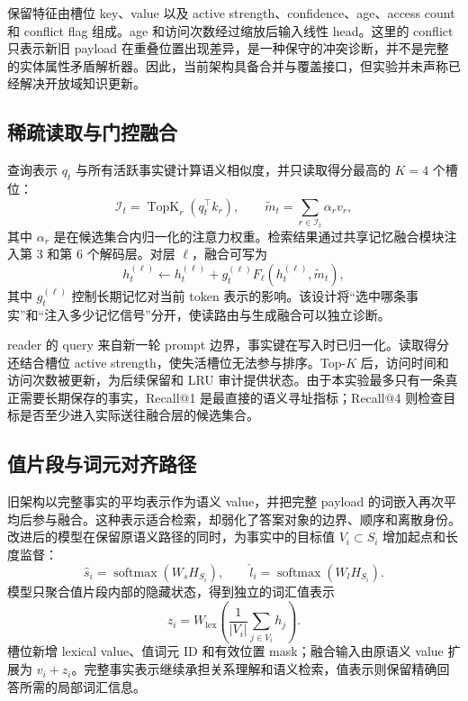 \documentclass[letterpaper]{article}
\begin{document}
保留特征由槽位 key、value 以及 active strength、confidence、age、access count 和 conflict flag 组成。age 和访问次数经过缩放后输入线性 head。这里的 conflict 只表示新旧 payload 在重叠位置出现差异，是一种保守的冲突诊断，并不是完整的实体属性矛盾解析器。因此，当前架构具备合并与覆盖接口，但实验并未声称已经解决开放域知识更新。

\subsection{稀疏读取与门控融合}

查询表示 $q_t$ 与所有活跃事实键计算语义相似度，并只读取得分最高的 $K=4$ 个槽位：
\begin{equation}
\mathcal{I}_t=\operatorname{TopK}_{r}
\left(q_t^\top k_r\right),\qquad
\tilde m_t=\sum_{r\in\mathcal{I}_t}\alpha_r v_r,
\end{equation}
其中 $\alpha_r$ 是在候选集合内归一化的注意力权重。检索结果通过共享记忆融合模块注入第 3 和第 6 个解码层。对层 $\ell$，融合可写为
\begin{equation}
h_t^{(\ell)}\leftarrow h_t^{(\ell)}+
g_t^{(\ell)}F_{\ell}\!\left(h_t^{(\ell)},\tilde m_t\right),
\end{equation}
其中 $g_t^{(\ell)}$ 控制长期记忆对当前 token 表示的影响。该设计将“选中哪条事实”和“注入多少记忆信号”分开，使读路由与生成融合可以独立诊断。

reader 的 query 来自新一轮 prompt 边界，事实键在写入时已归一化。读取得分还结合槽位 active strength，使失活槽位无法参与排序。Top-$K$ 后，访问时间和访问次数被更新，为后续保留和 LRU 审计提供状态。由于本实验最多只有一条真正需要长期保存的事实，Recall@1 是最直接的语义寻址指标；Recall@4 则检查目标是否至少进入实际送往融合层的候选集合。

\subsection{值片段与词元对齐路径}

旧架构以完整事实的平均表示作为语义 value，并把完整 payload 的词嵌入再次平均后参与融合。这种表示适合检索，却弱化了答案对象的边界、顺序和离散身份。改进后的模型在保留原语义路径的同时，为事实中的目标值 $V_i\subset S_i$ 增加起点和长度监督：
\begin{equation}
\hat s_i=\operatorname{softmax}(W_s H_{S_i}),\qquad
\hat l_i=\operatorname{softmax}(W_l H_{S_i}).
\end{equation}
模型只聚合值片段内部的隐藏状态，得到独立的词汇值表示
\begin{equation}
z_i=W_{\mathrm{lex}}
\left(\frac{1}{|V_i|}\sum_{j\in V_i}h_j\right).
\end{equation}
槽位新增 lexical value、值词元 ID 和有效位置 mask；融合输入由原语义 value 扩展为 $v_i+z_i$。完整事实表示继续承担关系理解和语义检索，值表示则保留精确回答所需的局部词汇信息。
\end{document}

